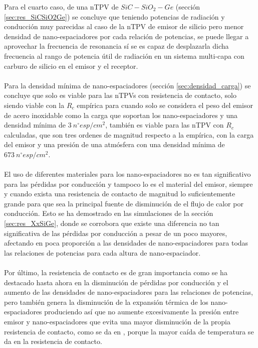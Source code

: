 Para el cuarto caso, de una nTPV de $SiC-SiO_2-Ge$ (sección \ref{sec:res_SiCSiO2Ge}) se concluye que teniendo potencias de radiación y conducción muy parecidas al caso de la nTPV de emisor de silicio pero menor densidad de nano-espaciadores por cada relación de potencias, se puede llegar a aprovechar la frecuencia de resonancia sí se es capaz de desplazarla dicha frecuencia al rango de potencia útil de radiación en un sistema multi-capa con carburo de silicio en el emisor y el receptor.\\\\
Para la densidad mínima de nano-espaciadores (sección \ref{sec:densidad_carga}) se concluye que solo es viable para las nTPVs con resistencia de contacto, solo siendo viable con la $R_c$ empírica para cuando solo se considera el peso del emisor de acero inoxidable como la carga que soportan los nano-espaciadores y una densidad mínima de $3 \ n^{\circ}esp/cm^2$, también es viable para las nTPV con $R_c$ calculadas, que son tres ordenes de magnitud respecto a la empírica, con la carga del emisor y una presión de una atmósfera con una densidad mínima de $673 \ n^{\circ}esp/cm^2$.\\\\
El uso de diferentes materiales para los nano-espaciadores no es tan significativo para las pérdidas por conducción y tampoco lo es el material del emisor, siempre y cuando exista una resistencia de contacto de magnitud lo suficientemente grande para que sea la principal fuente de disminución de el flujo de calor por conducción. Esto se ha demostrado en las simulaciones de la sección \ref{sec:res_XxSiGe}, donde se corrobora que existe una diferencia no tan significativa de las pérdidas por conducción a pesar de un poco mayores, afectando en poca proporción a las densidades de nano-espaciadores para todas las relaciones de potencias para cada altura de nano-espaciador.\\\\
Por último, la resistencia de contacto es de gran importancia como se ha destacado hasta ahora en la disminución de pérdidas por conducción y el aumento de las densidades de nano-espaciadores para las relaciones de potencias, pero también genera la disminución de la expansión térmica de los nano-espaciadores produciendo así que no aumente excesivamente la presión entre emisor y nano-espaciadores que evita una mayor disminución de la propia resistencia de contacto, como se da en \cite{experimental_Rc_SS}, porque la mayor caída de temperatura se da en la resistencia de contacto.
